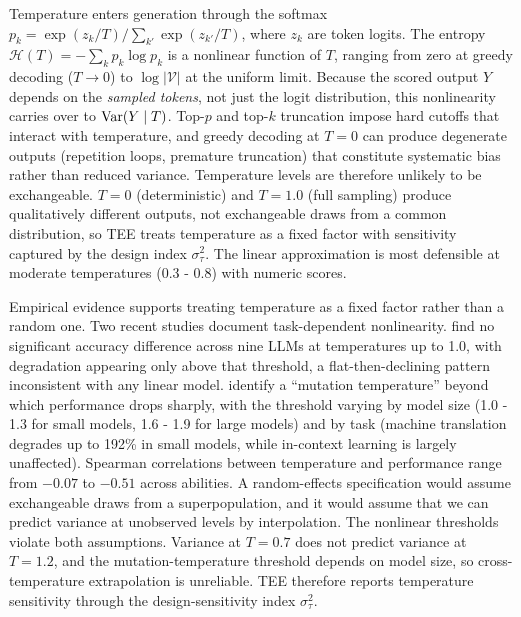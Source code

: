 Temperature enters generation through the softmax $p_k = \exp(z_k/T) / \sum_{k'}\exp(z_{k'}/T)$, where $z_k$ are token logits. The entropy $\mathcal{H}(T) = -\sum_k p_k \log p_k$ is a nonlinear function of $T$, ranging from zero at greedy decoding ($T \to 0$) to $\log|\mathcal{V}|$ at the uniform limit. Because the scored output $Y$ depends on the \emph{sampled tokens}, not just the logit distribution, this nonlinearity carries over to $\operatorname{Var}(Y \mid T)$. Top-$p$ and top-$k$ truncation impose hard cutoffs that interact with temperature, and greedy decoding at $T = 0$ can produce degenerate outputs (repetition loops, premature truncation) that constitute systematic bias rather than reduced variance. Temperature levels are therefore unlikely to be exchangeable. $T = 0$ (deterministic) and $T = 1.0$ (full sampling) produce qualitatively different outputs, not exchangeable draws from a common distribution, so TEE treats temperature as a fixed factor with sensitivity captured by the design index $\sigma^2_\tau$. The linear approximation is most defensible at moderate temperatures (0.3 - 0.8) with numeric scores.

Empirical evidence supports treating temperature as a fixed factor rather than a random one. Two recent studies document task-dependent nonlinearity. \citet{renze2024temperature} find no significant accuracy difference across nine LLMs at temperatures up to 1.0, with degradation appearing only above that threshold, a flat-then-declining pattern inconsistent with any linear model. \citet{li2025hotcold} identify a ``mutation temperature'' beyond which performance drops sharply, with the threshold varying by model size (1.0 - 1.3 for small models, 1.6 - 1.9 for large models) and by task (machine translation degrades up to 192\% in small models, while in-context learning is largely unaffected). Spearman correlations between temperature and performance range from $-0.07$ to $-0.51$ across abilities. A random-effects specification would assume exchangeable draws from a superpopulation, and it would assume that we can predict variance at unobserved levels by interpolation. The nonlinear thresholds violate both assumptions. Variance at $T = 0.7$ does not predict variance at $T = 1.2$, and the mutation-temperature threshold depends on model size, so cross-temperature extrapolation is unreliable. TEE therefore reports temperature sensitivity through the design-sensitivity index $\sigma^2_\tau$.



\clearpage

